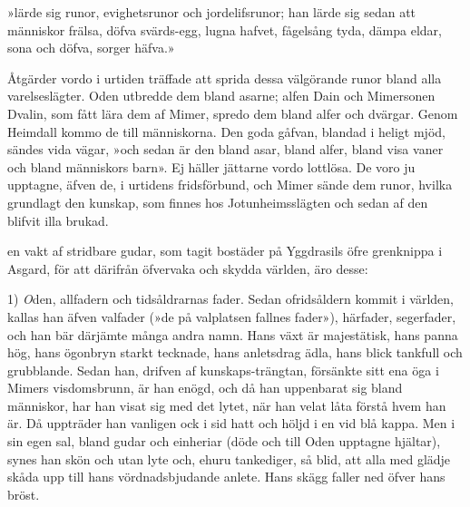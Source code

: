 {»lärde sig runor,}
{evighetsrunor}
{och jordelifsrunor;}
{han lärde sig sedan}
{att människor frälsa,}
{döfva svärds-egg,}
{lugna hafvet,}
{fågelsång tyda,}
{dämpa eldar,}
{sona och döfva,}
{sorger häfva.»}

Åtgärder vordo i urtiden träffade att sprida dessa välgörande runor
bland alla varelseslägter. Oden utbredde dem
bland asarne; alfen Dain och Mimersonen Dvalin, som fått lära dem af
Mimer, spredo dem bland alfer och dvärgar. Genom Heimdall kommo de till
människorna. Den goda gåfvan, blandad i heligt mjöd, sändes vida vägar,
»och sedan är den bland asar, bland alfer, bland visa vaner och bland
människors barn». Ej häller jättarne vordo lottlösa. De voro ju
upptagne, äfven de, i urtidens fridsförbund, och Mimer sände dem runor,
hvilka grundlagt den kunskap, som finnes hos Jotunheimsslägten och sedan
af den blifvit illa brukad.

\endSecII


\dropcapD en vakt af stridbare gudar, som tagit bostäder på Yggdrasils öfre
grenknippa i Asgard, för att därifrån öfvervaka och skydda världen, äro
desse:

1) {\emph Oden}, allfadern och tidsåldrarnas fader. Sedan ofridsåldern
kommit i världen, kallas han äfven valfader (»de på valplatsen fallnes
fader»), härfader, segerfader, och han bär därjämte många andra namn.
Hans växt är majestätisk, hans panna hög, hans ögonbryn starkt tecknade,
hans anletsdrag ädla, hans blick tankfull och grubblande. Sedan han,
drifven af kunskaps-trängtan, försänkte sitt ena öga i Mimers
visdomsbrunn, är han enögd, och då han uppenbarat sig bland människor,
har han visat sig med det lytet, när han velat låta förstå hvem han är.
Då uppträder han vanligen ock i sid hatt och höljd i en vid blå kappa.
Men i sin egen sal, bland gudar och einheriar (döde och till Oden
upptagne hjältar), synes han skön och utan lyte och, ehuru tankediger,
så blid, att alla med glädje skåda upp till hans vördnadsbjudande
anlete. Hans skägg faller ned öfver hans bröst.

